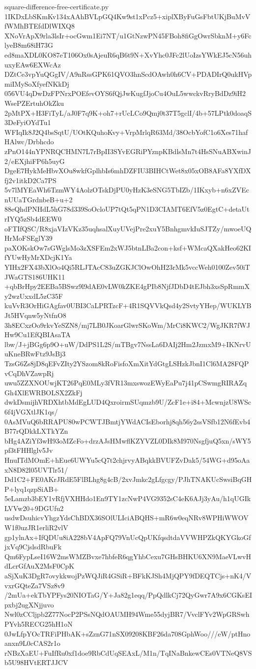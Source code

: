 \documentclass[11pt]{article}
\theoremstyle{definition}
\theoremstyle{remark}
\begin{document}
\begin{filecontents*}[overwrite]{square-difference-free-certificate.py}
1IKDxLbSKmKv134xAAhBVLpGQ4Kw9st1xPcz5+xiplXByFuGsFbtUKjBuMvVfWMhBTEfdDlWIXQ8
XNoVrApX9rla3lsIr+ocGwm1Ei7NT/u1GtNzwPN45FBoh8fiGgOwrSbknM+y6FclyeB8m68iH73G
ed8maXDL0KO87eT106Ox0sAjeuR6qB6t9N+XvYhc0JFc2lUoIzsYWkEJ5cN56uhuxyEAw6EXWcAz
DZtCe3vpYuQGgIV/A9nRssGPK61QVO3hnScdOAwh0h6CV+PDADIrQ0ukHVpmiIMySoXfyefNKkDj
056VU4qDwDzFPNrxPOEfevOYS6fQjJwKugfJjoCu4OuL5wwckvRryBdDz9iH2WsePZErtuhOkZku
2pMtPX+H3FiTyL/aJ0F7q9K+oh7+rUcLCo9Qmj0t37T5gclI/4b+57LPtk0doaqS3DeFyiOYdTu1
WFIqIk8J2Q4bsSqtU/UOtKQuhoKvy+VrpMrlqR63Md/38OcbYofC1o6Xes71hafHAlwc/Drbhcdo
zPnO144nYPNRQCHMN7L7rBpII3SYvEGRiPYznpKBdlsMn7t4HsSNuABXwinJ2/eEXjhiFP6h5uyG
DgeE7HykMeHbvXOu8wkfGplhbIs6mhDZFIU3BIHCtWet8x05xOB8AFa8YXfDXfj2v1itkD2Ca7PS
5v7lMYEaWh6TzmWY4AolzOTskDjPU0yHzK3eSNG5TbIZb/1IKxyb+n6xZVEcnUUaTGrdnbeB+u+2
88eQhdPNHdL5hG78d339SoOcloUP7tQt5qPN1D3CIAMT6EfV5z0EgtC+detaUtrIYQ5zSb4dEEW0
oFTIfQSC/R8xjaVIzVKz35uqhsalXuyUVejPre2xuY5BnhgmvkIuSJTZy/mwoeUQHrMoFSEglY39
paXOKskOw7sGWglsMo3zXSFEm2xWJ5btnLBa2con+ksf+WMcaQXakHeo62KIfYUwHyMrXDcjK1Ya
YIHx2FX43bXlOo4Qi5RLJTAcC83uZGKJClOwOhH23rMk5vccWeh0100Zev50iTJWaGTS186UHK11
+qbBrHpy2EEBa5BSwz9l9dAE0vLW0kZKE4gPIb8NjfJDbD4tEJbh3xsSpRmmXy2wzUxxdL5zC35F
kuVvR3OrHiGAgfav0UBI3CaLPRTzcF+4R1SQVVkQsd4y2SvtyYHep/WUKLYBJt5HVqnw5yNtfnO8
3h8ECxzOo9rkvYeSZN8/mj7LB0JKoarGlwrSKoWm/MrCi8KWC2/WgJKR7fWJHw9Cu1EfQBIAsaTA
lbw/J+jBGg6p9O+uW/DdPS1L2S/mTBgv7NssLa6DAIj2Hm2JzmxM9+IKNrvUuKneBRwFtz9JsBj3
TzsG6Zs8jD8qEFvZIty2YSzom8kRoFisfoXmXitYdGtgLSHzkJbnI1Cl6MA28FQPvCqDhVZawpRj
uwu5ZZXNOUwjKT26PqE0MLy3fVR13mxswozEWyEaPu7j41pCSwmgRIRAZqGh4XlEWRBOLSX2ZkFj
dwkDsmijhVRDXhtbMdEgLUD4QxroirmSUqmzb9U/ZcF1e+i84+McwnjzU8WSc6f4jVGXtlJK1qs/
0AsMVuQ6bRRAPU80wPCWTJBmtjYWdACIsEborhj8qh56y2ssVSfb12N6fEvb4B77rQDkkLXTkYZn
bHg4AZiYf3wH93oMZcFo+drzAJsHMwflKZYVZL0DIk8M970NsgfjuQ5xn/sWY5pf3tFHHlglv5Jv
HnuITdMOmE+hEue6UWYu5cQ7t2chjrvyABqkkBVUFZvDak5/54WG+d95oAaxN8D82l05UVTlr51/
Dd1C2+FE0AKrJRdE5FlBLhg8g4cB/2xvJmkc2gLfgcgy/PJhTNAKUcSwsiBqGHP+lyq1qzpSiAB+
5eLamzb3bEY1vRfjVXHHdo1En9TY1zcNwP4VG9352sC4eK6AJj3yAu/h1qUGIkLVVw20+9DGUfu2
usdwDsuhicvYhgzYdsChBDX36SOlULIciABQHS+mR6w0eqNRv8WPHiWWOVW1f0uzJR1erliR2vlV
gp1ylnAx+IfQDUu8iA228bV4ApFQ79VnUcQpUKfqsdtdaVVWHPZkQKYGkoGfjxVq9CjslsdRbuFk
Qm6FypLseI16W2msWMZBvxe7hbfeR6qgYhbCexu7GHsBHKU6XN9MaeVLwvHdLcrGfAuX2MsF0CpK
aSjXuK3DgR7ovykkwojPzWQJiR4GSiR+BFkKJSh4MjQPY9fDEQTCjs+nK4/VvxrGQteZa7VSz8v9
/2mUa+ekTbYPFys20NIOTaG/Y+Ja82g1eqq/PpQdlkCj72QyGwr7A9x6CGKsEIpxbj2ugXNjjuvo
Nwl0zCCljpb2Z77NocP2PSsNQdOAUMH94Wme55dyjBR7/VvclFYv2WpGRSwhPYvh5RECG25hH1oN
0JwLfpYOcTRFiPHbAK+sZznG71nSX09208KBF26da708GphWoo///eW/ptHnoanxn9L0cCAS2r1o
rNBzXaEU+FuIfRu0xf1doe9RbCdUqSEAxL/M1n/TqINaBnkewCEs0VTNeQ8VSb5U98HVtERTJJCV

\end{filecontents*}
\end{document}
